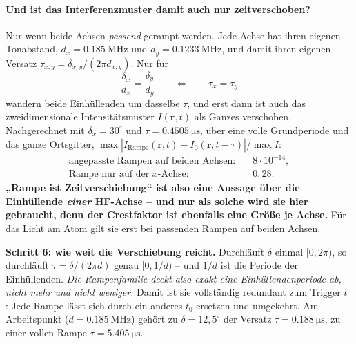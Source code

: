 \documentclass[11pt,a4paper]{article}
\begin{document}
\paragraph{Und ist das Interferenzmuster damit auch nur zeitverschoben?}
Nur wenn beide Achsen \emph{passend} gerampt werden. Jede Achse hat ihren
eigenen Tonabstand, $d_x=\SI{0.185}{\mega\hertz}$ und
$d_y=\SI{0.1233}{\mega\hertz}$, und damit ihren eigenen Versatz
$\tau_{x,y}=\delta_{x,y}/(2\pi d_{x,y})$. Nur für
\begin{equation}
  \frac{\delta_x}{d_x} = \frac{\delta_y}{d_y}
  \qquad\Longleftrightarrow\qquad \tau_x = \tau_y
\end{equation}
wandern beide Einhüllenden um dasselbe $\tau$, und erst dann ist auch das
zweidimensionale Intensitätsmuster $I(\mathbf r,t)$ als Ganzes verschoben.
Nachgerechnet mit $\delta_x = 30^\circ$ und $\tau=\SI{0.4505}{\micro\second}$,
über eine volle Grundperiode und das ganze Ortsgitter,
$\max|I_\mathrm{Rampe}(\mathbf r,t)-I_0(\mathbf r,t-\tau)|/\max I$:
\begin{align}
  \text{angepasste Rampen auf beiden Achsen:}&\quad 8\cdot10^{-14} ,\\
  \text{Rampe nur auf der $x$-Achse:}&\quad 0{,}28 .
\end{align}
\textbf{„Rampe ist Zeitverschiebung`` ist also eine Aussage über die
Einhüllende \emph{einer} HF-Achse -- und nur als solche wird sie hier
gebraucht, denn der Crestfaktor ist ebenfalls eine Größe je Achse.} Für das
Licht am Atom gilt sie erst bei passenden Rampen auf beiden Achsen.

\medskip
\noindent\textbf{Schritt 6: wie weit die Verschiebung reicht.} Durchläuft
$\delta$ einmal $[0,2\pi)$, so durchläuft $\tau = \delta/(2\pi d)$ genau
$[0,1/d)$ -- und $1/d$ ist die Periode der Einhüllenden. \emph{Die
Rampenfamilie deckt also exakt eine Einhüllendenperiode ab, nicht mehr und
nicht weniger.} Damit ist sie vollständig redundant zum Trigger $t_0$: Jede
Rampe lässt sich durch ein anderes $t_0$ ersetzen und umgekehrt. Am
Arbeitspunkt ($d=\SI{0.185}{\mega\hertz}$) gehört zu $\delta=12{,}5^\circ$
der Versatz $\tau=\SI{0.188}{\micro\second}$, zu einer vollen Rampe
$\tau=\SI{5.405}{\micro\second}$.
\end{document}
